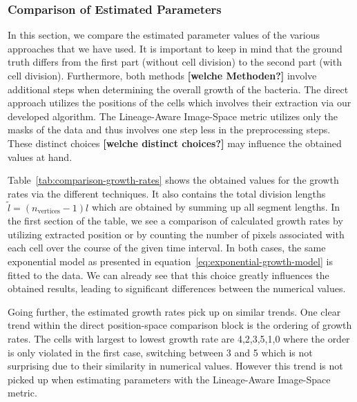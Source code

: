 \documentclass[10pt,letterpaper]{article}
\begin{document}
\subsubsection{Comparison of Estimated Parameters}
In this section, we compare the estimated parameter values of the various approaches that we have used.
It is important to keep in mind that the ground truth differs from the first part (without cell
division) to the second part (with cell division).
Furthermore, both methods {\bf [welche Methoden?]} involve additional steps when determining the
overall growth of the bacteria.
The direct approach utilizes the positions of the cells which involves their extraction via our
developed algorithm.
The Lineage-Aware Image-Space metric utilizes only the masks of the data and thus involves one step
less in the preprocessing steps.
These distinct choices {\bf [welche distinct choices?]} may influence the obtained values at hand.

Table~\ref{tab:comparison-growth-rates} shows the obtained values for the growth rates via the
different techniques.
It also contains the total division lengths $\tilde{l}=(n_\text{vertices}-1)l$ which are obtained by
summing up all segment lengths.
In the first section of the table, we see a comparison of calculated growth rates by utilizing
extracted position or by counting the number of pixels associated with each cell over the course of
the given time interval.
In both cases, the same exponential model as presented in equation~\ref{eq:exponential-growth-model}
is fitted to the data.
We can already see that this choice greatly influences the obtained results, leading to significant
differences between the numerical values.

Going further, the estimated growth rates pick up on similar trends.
One clear trend within the direct position-space comparison block is the ordering of growth rates.
The cells with largest to lowest growth rate are 4,2,3,5,1,0 where the order is only violated in
the first case, switching between 3 and 5 which is not surprising due to their similarity in
numerical values.
However this trend is not picked up when estimating parameters with the Lineage-Aware Image-Space
metric.
\end{document}
